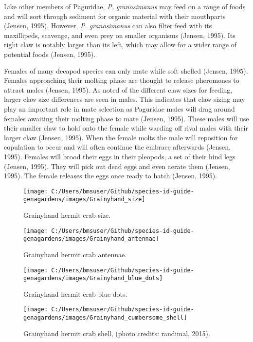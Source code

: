\documentclass[
]{article}
\begin{document}
Like other members of Paguridae, \emph{P. granosimanus} may feed on a
range of foods and will sort through sediment for organic material with
their mouthparts (Jensen, 1995). However, \emph{P. granosimanus} can
also filter feed with its maxillipeds, scavenge, and even prey on
smaller organisms (Jensen, 1995). Its right claw is notably larger than
its left, which may allow for a wider range of potential foods (Jensen,
1995).

Females of many decapod species can only mate while soft shelled
(Jensen, 1995). Females approaching their molting phase are thought to
release pheromones to attract males (Jensen, 1995). As noted of the
different claw sizes for feeding, larger claw size differences are seen
in males. This indicates that claw sizing may play an important role in
mate selection as Paguridae males will drag around females awaiting
their molting phase to mate (Jensen, 1995). These males will use their
smaller claw to hold onto the female while warding off rival males with
their larger claw (Jensen, 1995). When the female molts the male will
reposition for copulation to occur and will often continue the embrace
afterwards (Jensen, 1995). Females will brood their eggs in their
pleopods, a set of their hind legs (Jensen, 1995). They will pick out
dead eggs and even aerate them (Jensen, 1995). The female releases the
eggs once ready to hatch (Jensen, 1995).

\newpage

\begin{figure}

\texttt{[image: C:/Users/bmsuser/Github/species-id-guide-genagardens/images/Grainyhand\_size]} \hfill{}

\caption{Grainyhand hermit crab size.}\label{fig:Grainyhand_size}
\end{figure}

\begin{figure}

\texttt{[image: C:/Users/bmsuser/Github/species-id-guide-genagardens/images/Grainyhand\_antennae]} \hfill{}

\caption{Grainyhand hermit crab antennae.}\label{fig:Grainyhand_antennae}
\end{figure}

\begin{figure}

\texttt{[image: C:/Users/bmsuser/Github/species-id-guide-genagardens/images/Grainyhand\_blue\_dots]} \hfill{}

\caption{Grainyhand hermit crab blue dots.}\label{fig:Grainyhand_blue_dots}
\end{figure}
\begin{figure}

\texttt{[image: C:/Users/bmsuser/Github/species-id-guide-genagardens/images/Grainyhand\_cumbersome\_shell]} \hfill{}

\caption{Grainyhand hermit crab shell, (photo credits: randimal, 2015).}\label{fig:Grainyhand_cumbersome_shell}
\end{figure}
\newpage
\end{document}
